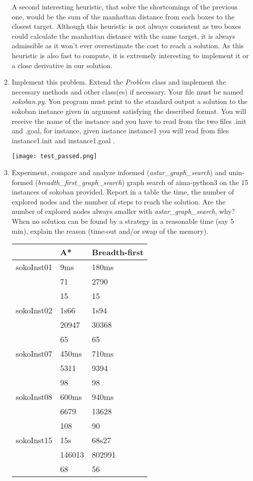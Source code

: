 \begin{enumerate}
\begin{framed}
    A second interesting heuristic, that solve the shortcomings of the
    previous one, would be the sum of the manhattan distance from each
    boxes to the closest target. Although this heuristic is not always
    consistent as two boxes could calculate the manhattan distance with the
    same target, it is always admissible as it won't ever overestimate the
    cost to reach a solution. As this heuristic is also fast to compute, it
    is extremely interesting to implement it or a close derivative in our
    solution.
    \end{framed}
  \item Implement this problem. Extend the \textit{Problem} class and implement the necessary
methods and other class(es) if necessary. Your file must be named \textit{sokoban.py}.
You program must print to the standard output a solution to the sokoban instance
given in argument satisfying the described format. You will receive the name
of the instance and you have to read from the two files .init and .goal, for
instance, given instance instance1 you will read from files instance1.init
and instance1.goal .
    \begin{framed}
        \texttt{[image: test\_passed.png]}
    \end{framed}
  \item Experiment, compare and analyze informed (\textit{astar\_graph\_search}) and unin-
formed (\textit{breadth\_first\_graph\_search}) graph search of aima-python3 on the 15
instances of sokoban provided. Report in a table the time, the number of
explored nodes and the number of steps to reach the solution. Are the
number of
explored nodes always smaller with \textit{astar\_graph\_search}, why?
When no solution can be found by a strategy in a reasonable time (say 5 min),
explain the reason (time-out and/or swap of the memory).
    \begin{framed}
    	\begin{tabular}{l|l|l}
    					& A* 		& Breadth-first\\
            \hline
    		sokoInst01 	& 9ms		& 180ms \\
    					& 71		& 2790 \\
    					& 15		& 15 \\
    		sokoInst02 	& 1s66		& 1s94 \\
    					& 20947 	& 30368 \\
    					& 65		& 65 \\
    		sokoInst07 	& 450ms		& 710ms \\
    					& 5311		& 9394 \\
    					& 98		& 98 \\
    		sokoInst08 	& 600ms		& 940ms \\
    					& 6679		& 13628 \\
    					& 108		& 90 \\
    		sokoInst15 	& 15s		& 68s27 \\
    					& 146013 	& 802991 \\
    					& 68		& 56 \\
    	\end{tabular}


\end{framed}
\end{enumerate}
